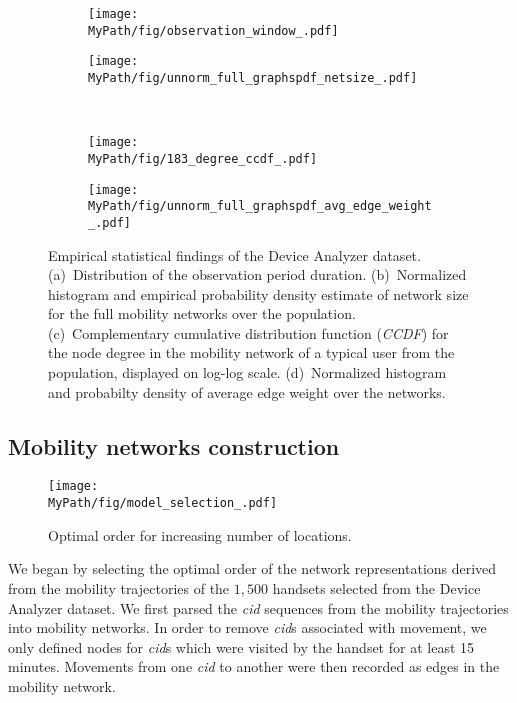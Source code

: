 \begin{figure*}[!t]
	\centering
	\begin{subfigure}[!t]{0.47\textwidth}
		\centering		\texttt{[image: \\MyPath/fig/observation\_window\_.pdf]}
		\caption{}
		\label{fig:num_of_days}
	\end{subfigure}%
	\begin{subfigure}[!t]{.47\textwidth}
		\centering
		\texttt{[image: \\MyPath/fig/unnorm\_full\_graphspdf\_netsize\_.pdf]}
		\caption{}
		\label{fig:sizes}
	\end{subfigure}%
	\\
	\begin{subfigure}[!t]{0.47\textwidth}
		\centering
		\texttt{[image: \\MyPath/fig/183\_degree\_ccdf\_.pdf]}
		\caption{}
		\label{fig:ccdf}
	\end{subfigure}
	\begin{subfigure}[!t]{0.47\textwidth}
		\centering
		\texttt{[image: \\MyPath/fig/unnorm\_full\_graphspdf\_avg\_edge\_weight\_.pdf]}
		\caption{}
		\label{fig:avg_edge_weight}
	\end{subfigure}
	\caption{Empirical statistical findings of the Device Analyzer dataset. (a)~Distribution of the observation period duration. (b)~Normalized histogram and empirical probability density estimate of network size for the full mobility networks over the population. (c)~Complementary cumulative distribution function (\emph{CCDF}) for the node degree in the mobility network of a typical user from the population, displayed on log-log scale. (d)~Normalized histogram and probabilty density of average edge weight over the networks.}
	\label{fig:eda}
\end{figure*}

\subsection{Mobility networks construction\label{sec:mobility-net-construct}}

\begin{figure*}[t]
	\centering
	\texttt{[image: \\MyPath/fig/model\_selection\_.pdf]}
	\caption{{Optimal order for increasing number of locations.}}
	\label{fig:model_selection}
\end{figure*}

We began by selecting the optimal order of the network representations derived from the mobility trajectories of the $1,500$ handsets selected from the Device Analyzer dataset.
We first parsed the \emph{cid} sequences from the mobility trajectories into mobility networks.
In order to remove \emph{cid}s associated with movement, we only defined nodes for \emph{cid}s which were visited by the handset for at least 15 minutes.
Movements from one \emph{cid} to another were then recorded as edges in the mobility network.

